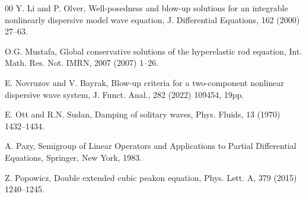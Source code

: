 \documentclass[preprint,12pt]{elsarticle}
\numberwithin{equation}{section}
\begin{document}
\begin{thebibliography}{00}
 Y. Li and P. Olver, Well-posedness and blow-up solutions for an integrable nonlinearly dispersive model wave equation, J. Differential Equations, 162 (2000) 27--63.


 O.G. Mustafa, Global conservative solutions of the hyperelastic rod equation, Int. Math. Res. Not. IMRN, 2007 (2007) 1--26.



 E. Novruzov and V. Bayrak, Blow-up criteria for a two-component nonlinear dispersive wave system, J. Funct. Anal., 282 (2022) 109454, 19pp.

 E. Ott and R.N. Sudan, Damping of solitary waves, Phys. Fluids, 13 (1970) 1432--1434.

 A. Pazy, Semigroup of Linear Operators and Applications to Partial Differential Equations, Springer, New York, 1983.

 Z. Popowicz, Double extended cubic peakon equation, Phys. Lett. A, 379 (2015) 1240--1245.







\end{thebibliography}
\end{document}
